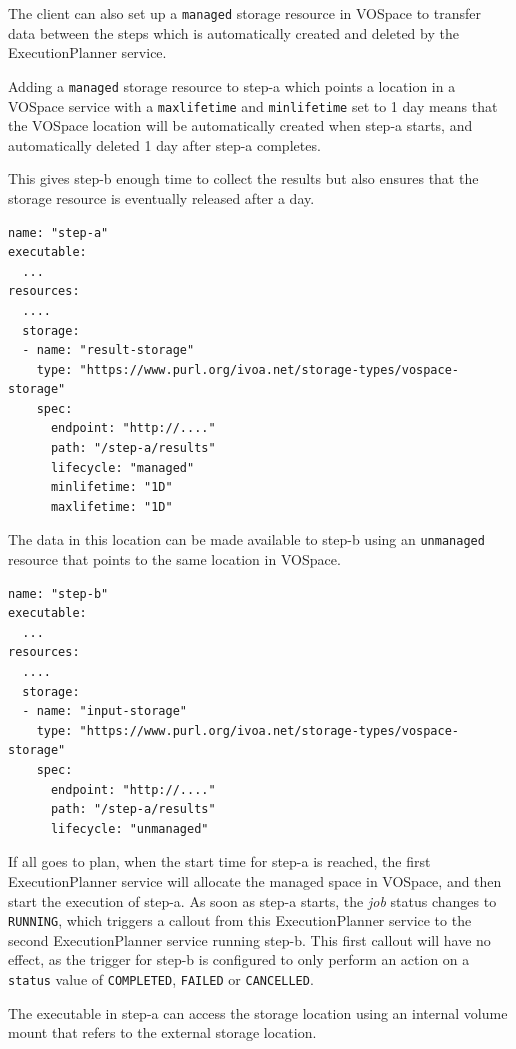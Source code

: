 \documentclass[11pt,a4paper]{ivoa}
\newcommand{\vospace} {VOSpace}
\newcommand{\execplanner} {ExecutionPlanner}
\newcommand{\codeword}[1] {\texttt{#1}}
\newcommand{\job} {\textit{job}}
\begin{document}
The client can also set up a \codeword{managed} storage resource in \vospace{} to transfer data
between the steps which is automatically created and deleted by the \execplanner{} service.

Adding a \codeword{managed} storage resource to step-a which points a location in a \vospace{} service
with a \codeword{maxlifetime} and \codeword{minlifetime} set to 1 day means that the \vospace{} location
will be automatically created when step-a starts, and automatically deleted 1 day after step-a completes.

This gives step-b enough time to collect the results but also ensures that the storage resource
is eventually released after a day.

\begin{lstlisting}[]
name: "step-a"
executable:
  ...
resources:
  ....
  storage:
  - name: "result-storage"
    type: "https://www.purl.org/ivoa.net/storage-types/vospace-storage"
    spec:
      endpoint: "http://...."
      path: "/step-a/results"
      lifecycle: "managed"
      minlifetime: "1D"
      maxlifetime: "1D"
\end{lstlisting}

The data in this location can be made available to step-b using an \codeword{unmanaged} resource
that points to the same location in \vospace{}.

\begin{lstlisting}[]
name: "step-b"
executable:
  ...
resources:
  ....
  storage:
  - name: "input-storage"
    type: "https://www.purl.org/ivoa.net/storage-types/vospace-storage"
    spec:
      endpoint: "http://...."
      path: "/step-a/results"
      lifecycle: "unmanaged"
\end{lstlisting}

If all goes to plan, when the start time for step-a is reached, the first \execplanner{}
service will allocate the managed space in \vospace{}, and then start the execution of step-a.
As soon as step-a starts, the \job{} status changes to \codeword{RUNNING},
which triggers a callout from this \execplanner{} service to the second
\execplanner{} service running step-b.
This first callout will have no effect, as the trigger
for step-b is configured to only perform an action on a \codeword{status}
value of \codeword{COMPLETED}, \codeword{FAILED} or \codeword{CANCELLED}.

The executable in step-a can access the storage location using an internal
volume mount that refers to the external storage location.
\end{document}

